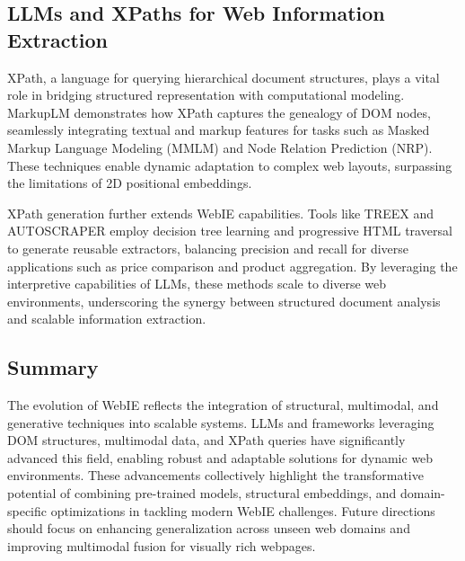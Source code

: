 \documentclass[a4paper]{article}
\begin{document}
\subsection{LLMs and XPaths for Web Information Extraction}

XPath, a language for querying hierarchical document structures, plays a vital role in bridging structured representation with computational modeling. MarkupLM \cite{DBLP:journals/corr/abs-2110-08518} demonstrates how XPath captures the genealogy of DOM nodes, seamlessly integrating textual and markup features for tasks such as Masked Markup Language Modeling (MMLM) and Node Relation Prediction (NRP). These techniques enable dynamic adaptation to complex web layouts, surpassing the limitations of 2D positional embeddings.

XPath generation further extends WebIE capabilities. Tools like TREEX \cite{10.1145/3018661.3018740} and AUTOSCRAPER \cite{huang-etal-2024-autoscraper} employ decision tree learning and progressive HTML traversal to generate reusable extractors, balancing precision and recall for diverse applications such as price comparison and product aggregation. By leveraging the interpretive capabilities of LLMs, these methods scale to diverse web environments, underscoring the synergy between structured document analysis and scalable information extraction.

\subsection{Summary}

The evolution of WebIE reflects the integration of structural, multimodal, and generative techniques into scalable systems. LLMs and frameworks leveraging DOM structures, multimodal data, and XPath queries have significantly advanced this field, enabling robust and adaptable solutions for dynamic web environments. These advancements collectively highlight the transformative potential of combining pre-trained models, structural embeddings, and domain-specific optimizations in tackling modern WebIE challenges. Future directions should focus on enhancing generalization across unseen web domains and improving multimodal fusion for visually rich webpages.
\end{document}
